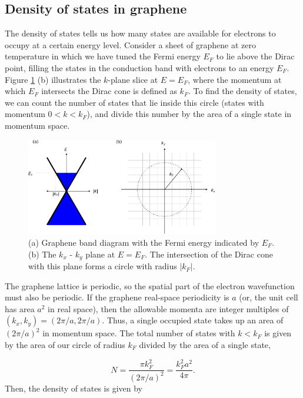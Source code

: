 \documentclass[double,12pt,1in,seploa]{beavtex}
\let\Oldsubsection\subsection
\renewcommand{\subsection}{\FloatBarrier\Oldsubsection}
\begin{document}
\subsection{Density of states in graphene}
The density of states tells us how many states are available for electrons to occupy at a certain energy level. Consider a sheet of graphene at zero temperature in which we have tuned the Fermi energy $E_F$ to lie above the Dirac point, filling the states in the conduction band with electrons to an energy $E_F$. Figure \ref{density of states graphic} (b) illustrates the $k$-plane slice at $E = E_F$, where the momentum at which $E_F$ intersects the Dirac cone is defined as $k_F$. To find the density of states, we can count the number of states that lie inside this circle (states with momentum $0 < k < k_F$), and divide this number by the area of a single state in momentum space.

\begin{figure}
    \includegraphics[width = 0.75\textwidth]{density of states graphic.pdf}
    \caption{(a) Graphene band diagram with the Fermi energy indicated by $E_F$. (b) The $k_x$ - $k_y$ plane at $E = E_F$. The intersection of the Dirac cone with this plane forms a circle with radius $|k_F|$.}
    \label{density of states graphic}
\end{figure}
The graphene lattice is periodic, so the spatial part of the electron wavefunction must also be periodic. If the graphene real-space periodicity is $a$ (or, the unit cell has area $a^2$ in real space), then the allowable momenta are integer multiples of $(k_x, k_y) = (2\pi/a, 2\pi/a)$. Thus, a single occupied state takes up an area of $(2\pi/a)^2$ in momentum space. The total number of states with $k < k_F$ is given by the area of our circle of radius $k_F$ divided by the area of a single state,

\begin{equation}
    N = \frac{\pi k_F^2}{(2\pi/a)^2} = \frac{k_F^2 a^2}{4\pi}. 
\end{equation}
Then, the density of states is given by 
\end{document}
